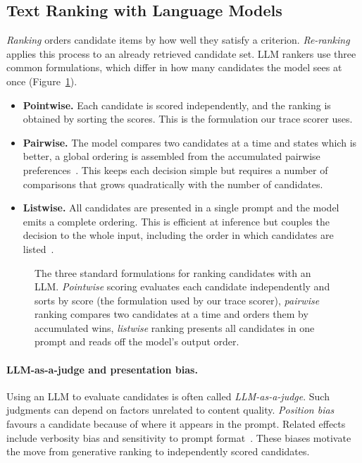 \subsection{Text Ranking with Language Models}
\label{subsec:bg-ranking}

\emph{Ranking} orders candidate items by how well they satisfy a criterion. \emph{Re-ranking} applies
this process to an already retrieved candidate set. LLM rankers use three common formulations, which
differ in how many candidates the model sees at once (Figure~\ref{fig:ranking-formulations}).

\begin{itemize}
\item \textbf{Pointwise.} Each candidate is scored independently, and the ranking is obtained by
sorting the scores. This is the formulation our trace scorer uses.
\item \textbf{Pairwise.} The model compares two candidates at a time and states which is better, a
global ordering is assembled from the accumulated pairwise
preferences~\cite{qin2024largelanguagemodelseffective}. This keeps each decision simple but requires a
number of comparisons that grows quadratically with the number of candidates.
\item \textbf{Listwise.} All candidates are presented in a single prompt and the model emits a complete
ordering. This is efficient at inference but couples the decision to the whole input, including the
order in which candidates are listed~\cite{liu-etal-2025-lipo}.
\end{itemize}

\begin{figure}[htbp]
  \centering
  
  \caption{The three standard formulations for ranking candidates with an LLM. \emph{Pointwise}
  scoring evaluates each candidate independently and sorts by score (the formulation used by our
  trace scorer), \emph{pairwise} ranking compares two candidates at a time and orders them by
  accumulated wins, \emph{listwise} ranking presents all candidates in one prompt and reads off the
  model's output order.}
  \label{fig:ranking-formulations}
\end{figure}

\paragraph{LLM-as-a-judge and presentation bias.}
Using an LLM to evaluate candidates is often called \emph{LLM-as-a-judge}. Such judgments can depend
on factors unrelated to content quality. \emph{Position bias} favours a candidate because of where it
appears in the prompt. Related effects include verbosity bias and sensitivity to prompt
format~\cite{shi2025judgingjudgessystematicstudy,qiao2026llmbasedlistwisererankingeffect}. These
biases motivate the move from generative ranking to independently scored candidates.


